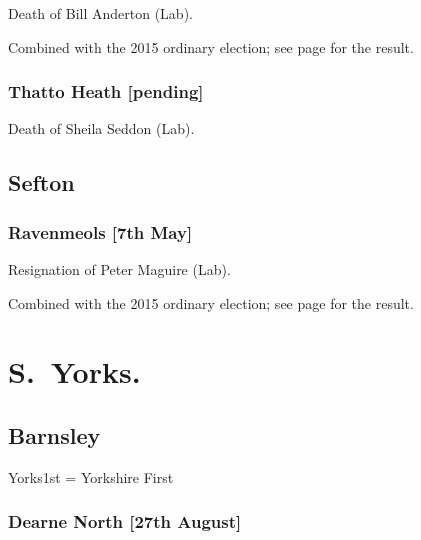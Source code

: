 \documentclass[a4paper,openany]{book}
\begin{document}
\begin{resultsiii}

Death of Bill Anderton (Lab).

Combined with the 2015 ordinary election; see page \pageref{HaydockStHelens} for the result.

\subsubsection*{Thatto Heath \hspace*{\fill}\nolinebreak[1]%
\enspace\hspace*{\fill}
[pending]}


Death of Sheila Seddon (Lab).

\subsection*{Sefton}

\subsubsection*{Ravenmeols \hspace*{\fill}\nolinebreak[1]%
\enspace\hspace*{\fill}
[7th May]}


Resignation of Peter Maguire (Lab).

Combined with the 2015 ordinary election; see page \pageref{RavenmeolsSefton} for the result.

\section[South Yorkshire]{S.\ Yorks.}

\subsection*{Barnsley}

Yorks1st = Yorkshire First

\subsubsection*{Dearne North \hspace*{\fill}\nolinebreak[1]%
\enspace\hspace*{\fill}
[27th August]}


\end{resultsiii}
\end{document}
